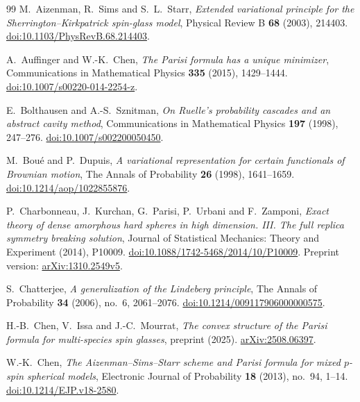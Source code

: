 \documentclass[11pt,a4paper]{article}
\numberwithin{equation}{section}
\theoremstyle{definition}
\theoremstyle{remark}
\begin{document}
\begin{thebibliography}{99}
M.~Aizenman, R.~Sims and S.~L.~Starr,
\emph{Extended variational principle for the Sherrington--Kirkpatrick spin-glass model},
Physical Review B \textbf{68} (2003), 214403.
\href{https://doi.org/10.1103/PhysRevB.68.214403}{doi:10.1103/PhysRevB.68.214403}.

A.~Auffinger and W.-K.~Chen,
\emph{The Parisi formula has a unique minimizer},
Communications in Mathematical Physics \textbf{335} (2015), 1429--1444.
\href{https://doi.org/10.1007/s00220-014-2254-z}{doi:10.1007/s00220-014-2254-z}.

E.~Bolthausen and A.-S.~Sznitman,
\emph{On Ruelle's probability cascades and an abstract cavity method},
Communications in Mathematical Physics \textbf{197} (1998), 247--276.
\href{https://doi.org/10.1007/s002200050450}{doi:10.1007/s002200050450}.

M.~Bou\'e and P.~Dupuis,
\emph{A variational representation for certain functionals of Brownian motion},
The Annals of Probability \textbf{26} (1998), 1641--1659.
\href{https://doi.org/10.1214/aop/1022855876}{doi:10.1214/aop/1022855876}.

P.~Charbonneau, J.~Kurchan, G.~Parisi, P.~Urbani and F.~Zamponi,
\emph{Exact theory of dense amorphous hard spheres in high dimension.
III. The full replica symmetry breaking solution},
Journal of Statistical Mechanics: Theory and Experiment (2014), P10009.
\href{https://doi.org/10.1088/1742-5468/2014/10/P10009}{doi:10.1088/1742-5468/2014/10/P10009}.
Preprint version: \href{https://arxiv.org/abs/1310.2549v5}{arXiv:1310.2549v5}.

S.~Chatterjee,
\emph{A generalization of the Lindeberg principle},
The Annals of Probability \textbf{34} (2006), no.~6, 2061--2076.
\href{https://doi.org/10.1214/009117906000000575}{doi:10.1214/009117906000000575}.

H.-B.~Chen, V.~Issa and J.-C.~Mourrat,
\emph{The convex structure of the Parisi formula for multi-species spin glasses},
preprint (2025).
\href{https://arxiv.org/abs/2508.06397}{arXiv:2508.06397}.

W.-K.~Chen,
\emph{The Aizenman--Sims--Starr scheme and Parisi formula for mixed
$p$-spin spherical models},
Electronic Journal of Probability \textbf{18} (2013), no.~94, 1--14.
\href{https://doi.org/10.1214/EJP.v18-2580}{doi:10.1214/EJP.v18-2580}.


\end{thebibliography}
\end{document}
